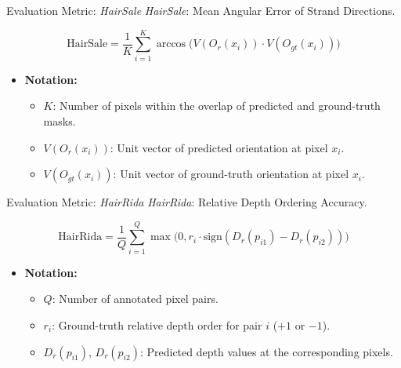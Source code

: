 \begin{frame}[t]{Evaluation Metric: \emph{HairSale}}
    \emph{HairSale}: Mean Angular Error of Strand Directions.

    \begin{equation*}
        \text{HairSale} = \frac{1}{K} \sum_{i=1}^{K} \arccos\bigl( V(O_r(x_i)) \cdot V(O_{gt}(x_i)) \bigr)
    \end{equation*}

    \begin{itemize}
        \item \textbf{Notation:}
        \begin{itemize}
            \item $K$: Number of pixels within the overlap of predicted and ground-truth masks.
            \item $V(O_r(x_i))$: Unit vector of predicted orientation at pixel $x_i$.
            \item $V(O_{gt}(x_i))$: Unit vector of ground-truth orientation at pixel $x_i$.
        \end{itemize}
    \end{itemize}
\end{frame}

\begin{frame}[t]{Evaluation Metric: \emph{HairRida}}
    \emph{HairRida}: Relative Depth Ordering Accuracy.

    \begin{equation*}
        \text{HairRida} = \frac{1}{Q} \sum_{i=1}^{Q} \max\bigl(0, r_i \cdot \text{sign}(D_r(p_{i1}) - D_r(p_{i2}))\bigr)
    \end{equation*}

    \begin{itemize}
        \item \textbf{Notation:}
        \begin{itemize}
            \item $Q$: Number of annotated pixel pairs.
            \item $r_i$: Ground-truth relative depth order for pair $i$ ($+1$ or $-1$).
            \item $D_r(p_{i1})$, $D_r(p_{i2})$: Predicted depth values at the corresponding pixels.
        \end{itemize}
    \end{itemize}
\end{frame}

